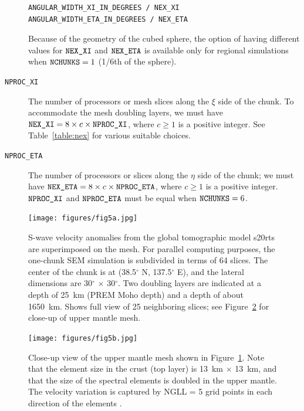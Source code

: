 \begin{description}
\begin{verbatim}
ANGULAR_WIDTH_XI_IN_DEGREES / NEX_XI
ANGULAR_WIDTH_ETA_IN_DEGREES / NEX_ETA
\end{verbatim}
Because of the geometry of the cubed sphere, the option of having
different values for $\mbox{\texttt{NEX\_XI}}$ and $\mbox{\texttt{NEX\_ETA}}$ is available only for
regional simulations when $\mbox{\texttt{NCHUNKS}}=1$ (1/6th of the sphere).
%
\item [{\texttt{NPROC\_XI}}] The number of processors or mesh slices along the
$\xi$ side of the chunk. To accommodate the mesh doubling layers,
we must have $\mbox{\texttt{NEX\_XI}}=8\times c\times\mbox{\texttt{NPROC\_XI}}$, where $c\ge1$ is
a positive integer. See Table~\ref{table:nex} for various suitable
choices.
%
\item [{\texttt{NPROC\_ETA}}] The number of processors or slices along the $\eta$
side of the chunk; we must have $\mbox{\texttt{NEX\_ETA}}=8\times c\times\mbox{\texttt{NPROC\_ETA}}$,
where $c\ge1$ is a positive integer. $\mbox{\texttt{NPROC\_XI}}$ and $\mbox{\texttt{NPROC\_ETA}}$
must be equal when $\mbox{\texttt{NCHUNKS}}=6$.
\end{description}
%
\begin{figure}[H]
\begin{centering}
\texttt{[image: figures/fig5a.jpg]}
\par\end{centering}

\caption{S-wave velocity anomalies
from the global tomographic model s20rts \citep{RiVa00} are superimposed
on the mesh. For parallel computing purposes, the one-chunk SEM simulation
is subdivided in terms of 64 slices. The center of the chunk is at
(38.5$^{\circ}$ N, 137.5$^{\circ}$ E), and the lateral dimensions
are 30$^{\circ}$ $\times$ 30$^{\circ}$. Two doubling layers are
indicated at a depth of 25~km (PREM Moho depth) and a depth of about
1650~km. Shows full view of 25 neighboring slices; see Figure~\ref{fig:Close-up-view-of}
for close-up of upper mantle mesh.}
\label{fig:3D-spectral-element-mesh}
\end{figure}
%
\begin{figure}[H]
\begin{centering}
\texttt{[image: figures/fig5b.jpg]}
\par\end{centering}

\caption{Close-up view of the upper mantle
mesh shown in Figure~\ref{fig:3D-spectral-element-mesh}. Note that
the element size in the crust (top layer) is 13~km $\times$ 13~km,
and that the size of the spectral elements is doubled in the upper
mantle. The velocity variation is captured by NGLL = 5 grid points
in each direction of the elements \citep{KoTr02a,KoTr02b}.}
\label{fig:Close-up-view-of}
\end{figure}


